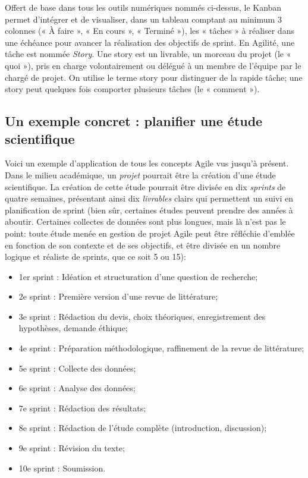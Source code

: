 \documentclass[
  letterpaper,
  DIV=11,
  numbers=noendperiod,
  oneside]{scrreprt}
\providecommand{\tightlist}{%
  \setlength{\itemsep}{0pt}\setlength{\parskip}{0pt}}\usepackage{longtable,booktabs,array}
\begin{document}
Offert de base dans tous les outils numériques nommés ci-dessus, le
Kanban permet d'intégrer et de visualiser, dans un tableau comptant au
minimum 3 colonnes (« À faire », « En cours », « Terminé »), les «
tâches » à réaliser dans une échéance pour avancer la réalisation des
objectifs de sprint. En Agilité, une tâche est nommée \emph{Story}. Une
story est un livrable, un morceau du projet (le « quoi »), pris en
charge volontairement ou délégué à un membre de l'équipe par le chargé
de projet. On utilise le terme story pour distinguer de la rapide tâche;
une story peut quelques fois comporter plusieurs tâches (le « comment
»).

\hypertarget{un-exemple-concret-planifier-une-uxe9tude-scientifique}{%
\subsection{Un exemple concret : planifier une étude
scientifique}\label{un-exemple-concret-planifier-une-uxe9tude-scientifique}}

Voici un exemple d'application de tous les concepts Agile vus jusqu'à
présent. Dans le milieu académique, un \emph{projet} pourrait être la
création d'une étude scientifique. La création de cette étude pourrait
être divisée en dix \emph{sprints} de quatre semaines, présentant ainsi
dix \emph{livrables} clairs qui permettent un suivi en planification de
sprint (bien sûr, certaines études peuvent prendre des années à aboutir.
Certaines collectes de données sont plus longues, mais là n'est pas le
point: toute étude menée en gestion de projet Agile peut être réfléchie
d'emblée en fonction de son contexte et de ses objectifs, et être
divisée en un nombre logique et réaliste de sprints, que ce soit 5 ou
15):

\begin{itemize}
\tightlist
\item
  1er sprint : Idéation et structuration d'une question de recherche;
\item
  2e sprint : Première version d'une revue de littérature;
\item
  3e sprint : Rédaction du devis, choix théoriques, enregistrement des
  hypothèses, demande éthique;
\item
  4e sprint : Préparation méthodologique, raffinement de la revue de
  littérature;
\item
  5e sprint : Collecte des données;
\item
  6e sprint : Analyse des données;
\item
  7e sprint : Rédaction des résultats;
\item
  8e sprint : Rédaction de l'étude complète (introduction, discussion);
\item
  9e sprint : Révision du texte;
\item
  10e sprint : Soumission.
\end{itemize}
\end{document}
